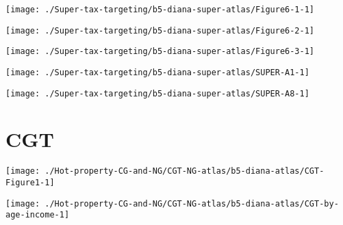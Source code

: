 \documentclass[tikz]{standalone}\usepackage[]{graphicx}\usepackage[]{color}
\newenvironment{knitrout}{}{} %
\begin{document}
\begin{knitrout}
\color{fgcolor}
\texttt{[image: ./Super-tax-targeting/b5-diana-super-atlas/Figure6-1-1]} 

\end{knitrout}

\begin{knitrout}
\color{fgcolor}
\texttt{[image: ./Super-tax-targeting/b5-diana-super-atlas/Figure6-2-1]} 

\end{knitrout}

\begin{knitrout}
\color{fgcolor}
\texttt{[image: ./Super-tax-targeting/b5-diana-super-atlas/Figure6-3-1]} 

\end{knitrout}

\begin{knitrout}
\color{fgcolor}
\texttt{[image: ./Super-tax-targeting/b5-diana-super-atlas/SUPER-A1-1]} 

\end{knitrout}
\begin{knitrout}
\color{fgcolor}
\texttt{[image: ./Super-tax-targeting/b5-diana-super-atlas/SUPER-A8-1]} 

\end{knitrout}

\section{CGT}







\begin{knitrout}
\color{fgcolor}
\texttt{[image: ./Hot-property-CG-and-NG/CGT-NG-atlas/b5-diana-atlas/CGT-Figure1-1]} 

\end{knitrout}

\begin{knitrout}
\color{fgcolor}
\texttt{[image: ./Hot-property-CG-and-NG/CGT-NG-atlas/b5-diana-atlas/CGT-by-age-income-1]} 

\end{knitrout}
\clearpage
\end{document}

